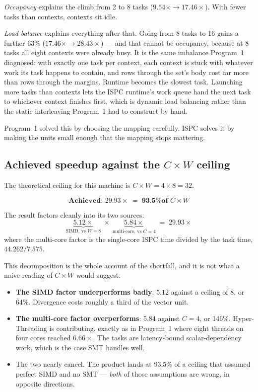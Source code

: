 \documentclass[11pt,a4paper]{article}
\begin{document}
\emph{Occupancy} explains the climb from 2 to 8 tasks ($9.54\times \to
17.46\times$). With fewer tasks than contexts, contexts sit idle.

\emph{Load balance} explains everything after that. Going from 8 tasks to 16
gains a further 63\% ($17.46\times \to 28.43\times$) --- and that cannot be
occupancy, because at 8 tasks all eight contexts were already busy. It is the
same imbalance Program~1 diagnosed: with exactly one task per context, each
context is stuck with whatever work its task happens to contain, and rows
through the set's body cost far more than rows through the margins. Runtime
becomes the slowest task. Launching more tasks than contexts lets the ISPC
runtime's work queue hand the next task to whichever context finishes first,
which is dynamic load balancing rather than the static interleaving Program~1
had to construct by hand.

Program~1 solved this by choosing the mapping carefully. ISPC solves it by
making the units small enough that the mapping stops mattering.

\subsection{Achieved speedup against the $C \times W$ ceiling}

The theoretical ceiling for this machine is $C \times W = 4 \times 8 = 32$.

\[
\textbf{Achieved: } 29.93\times \;=\; \textbf{93.5\% of } C \times W
\]

The result factors cleanly into its two sources:
\[
\underbrace{5.12\times}_{\text{SIMD, vs } W=8}
\;\times\;
\underbrace{5.84\times}_{\text{multi-core, vs } C=4}
\;=\; 29.93\times
\]
where the multi-core factor is the single-core ISPC time divided by the task
time, $44.262/7.575$.

This decomposition is the whole account of the shortfall, and it is not what a
naive reading of $C \times W$ would suggest.

\begin{itemize}
\item \textbf{The SIMD factor underperforms badly}: $5.12$ against a ceiling of
      $8$, or 64\%. Divergence costs roughly a third of the vector unit.
\item \textbf{The multi-core factor overperforms}: $5.84$ against $C = 4$, or
      146\%. Hyper-Threading is contributing, exactly as in Program~1 where
      eight threads on four cores reached $6.66\times$. The tasks are latency-bound
      scalar-dependency work, which is the case SMT handles well.
\item The two nearly cancel. The product lands at 93.5\% of a ceiling that
      assumed perfect SIMD and no SMT --- \emph{both} of those assumptions are
      wrong, in opposite directions.
\end{itemize}
\end{document}
